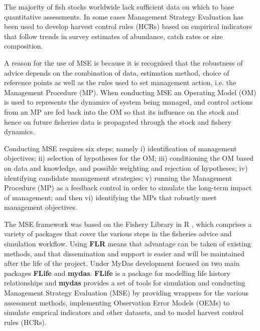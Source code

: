The majority of fish stocks worldwide lack sufficient data on which to base quantitative assessments. In some cases Management Strategy Evaluation \citep[MSE][]{10.1093/icesjms/fst232} has been used to develop harvest control rules (HCRs) based on empirical indicators that follow trends in survey estimates of abundance, catch rates or size composition. %

A reason for the use of MSE is because it is recognised that the robustness of advice depends on the combination of data, estimation method, choice of reference points as well as the rules used to set management action, i.e. the Management Procedure (MP). When conducting MSE an Operating Model (OM) is used to represents the dynamics of system being managed, and control actions from an MP are fed back into the OM so that its influence on the stock and hence on future fisheries data is propagated through the stock and fishery dynamics. 

Conducting MSE requires six steps; namely i) identification of management objectives; ii) selection of hypotheses for the OM; iii) conditioning the OM based on data and knowledge, and possible weighting and rejection of hypotheses; iv) identifying candidate management strategies; v) running the Management Procedure (MP) as a feedback control in order to simulate the long-term impact of management; and then vi) identifying the MPs that robustly meet management objectives. 

The MSE framework was based on the Fishery Library in R \citep[\href{http://www.flr-project.org/}{FLR}][]{kell2007flr}, which comprises a variety of packages that cover the various steps in the fisheries advice and simulation workflow. Using \textbf{FLR} means that advantage can be taken of existing methods, and that dissemination and support is easier and will be maintained after the life of the project. Under MyDas development focused on two main packages \textbf{FLife} and \textbf{mydas}. \textbf{FLife} is a package for modelling life history relationships and \textbf{mydas} provides a set of tools for simulation and conducting Management Strategy Evaluation (MSE) by providing wrappers for the various assessment methods, implementing Observation Error Models (OEMs) to simulate emprical indicators and other datasets, and to model harvest control rules (HCRs).

